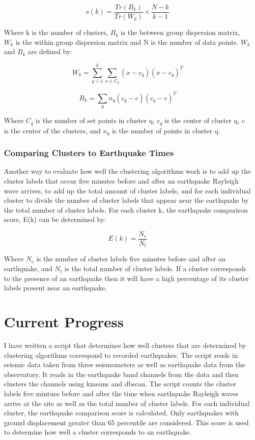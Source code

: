 \documentclass[colorlinks=true,pdfstartview=FitV,linkcolor=blue,
            citecolor=red,urlcolor=magenta]{ligodoc}
\begin{document}
\[s(k) = \frac{Tr(B_k)}{Tr(W_k)}\times\frac{N-k}{k-1}\]

\par Where k is the number of clusters, \(B_k\) is the between group dispersion matrix, \(W_k\) is the within group dispersion matrix and N is the number of data points. \(W_k\) and  \(B_k\) are defined by:

\[W_k = \sum_{q=1}^{k} \sum_{x \in C_q} (x-c_q)(x-c_q)^T\]

\[B_k = \sum_{q} n_q (c_q-c)(c_q-c)^T\]

\par Where \(C_q\) is the number of set points in cluster q, \(c_q\) is the center of cluster q, c is the center of the clusters, and \(n_q\) is the number of points in cluster q. \cite{Citation2} 

\subsubsection{Comparing Clusters to Earthquake Times}

\indent 

\par Another way to evaluate how well the clustering algorithms work is to add up the cluster labels that occur five  minutes before and after an earthquake Rayleigh wave arrives, to add up the total amount of cluster labels, and for each individual cluster to divide the number of cluster labels that appear near the earthquake by the total number of cluster labels. For each cluster k, the earthquake comparison score, E(k) can be determined by:

\[E(k) = \frac{N_e}{N_t}\]

Where \(N_e\) is the number of cluster labels five minutes before and after an earthquake, and \(N_t\) is the total number of cluster labels. If a cluster corresponds to the presence of an earthquake then it will have a high percentage of its cluster labels present near an earthquake.  

\section{Current Progress}

\indent 

\par I have written a script that determines how well clusters that are determined by clustering algorithms correspond to recorded earthquakes. The script reads in seismic data taken from three seismometers as well as earthquake data from the observatory. It reads in the earthquake band channels from the data and then clusters the channels using kmeans and dbscan. The script counts the cluster labels five mintues before and after the time when earthquake Rayleigh waves arrive at the site as well as the total number of cluster labels. For each individual cluster, the earthquake comparison score is calculated. Only earthquakes with ground displacement greater than 65 percentile are considered. This score is used to determine how well a cluster corresponds to an earthquake. 
\end{document}
